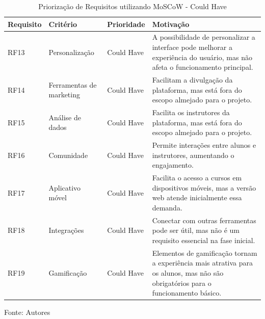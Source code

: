 \begin{apendicesenv}
\begin{table}[h]
    \centering
    \caption{Priorização de Requisitos utilizando MoSCoW - Could Have}
    \label{tab:priorizacao_moscow3}
    \begin{adjustbox}{width=\textwidth}
        \begin{tabular}{|p{2.5cm}|p{5cm}|p{5cm}|p{4cm}|}
            \hline
            \textbf{Requisito} & \textbf{Critério} & \textbf{Prioridade} & \textbf{Motivação} \\
            \hline
            RF13 & Personalização & Could Have & A possibilidade de personalizar a interface pode melhorar a experiência do usuário, mas não afeta o funcionamento principal. \\
            \hline
            RF14 & Ferramentas de marketing & Could Have & Facilitam a divulgação da plataforma, mas está fora do escopo almejado para o projeto. \\
            \hline
            RF15 & Análise de dados & Could Have & Facilita os instrutores da plataforma, mas está fora do escopo almejado para o projeto. \\
            \hline
            RF16 & Comunidade & Could Have & Permite interações entre alunos e instrutores, aumentando o engajamento. \\
            \hline
            RF17 & Aplicativo móvel & Could Have & Facilita o acesso a cursos em dispositivos móveis, mas a versão web atende inicialmente essa demanda. \\
            \hline
            RF18 & Integrações & Could Have & Conectar com outras ferramentas pode ser útil, mas não é um requisito essencial na fase inicial. \\
            \hline
            RF19 & Gamificação & Could Have & Elementos de gamificação tornam a experiência mais atrativa para os alunos, mas não são obrigatórios para o funcionamento básico. \\
            \hline
        \end{tabular}
    \end{adjustbox}
    \vspace{5mm}
    {\footnotesize Fonte: Autores} 
\end{table}



\end{apendicesenv}
